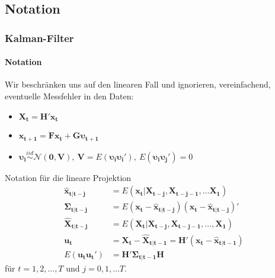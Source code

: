 \documentclass{beamer} %
\begin{document}
\subsection{Notation}
\begin{frame}\frametitle{Kalman-Filter}\framesubtitle{Notation}
Wir beschr\"{a}nken uns auf den linearen Fall und ignorieren, vereinfachend, eventuelle Messfehler in den Daten:
\begin{itemize}
    \item $\mathbf{X_t} = \mathbf{H}'\mathbf{x_t}$
    \item $    \mathbf{x_{t+1}} = \mathbf{F} \mathbf{x_t} + \mathbf{G}\boldsymbol{\upsilon_{t+1}}$
    \item $\boldsymbol{\upsilon_{i}} \overset{iid}{\sim} \mathcal{N}(\mathbf{0},\mathbf{V}),~ \mathbf{V} = E(\boldsymbol{\upsilon_{i}} \boldsymbol{\upsilon_{i}}'), ~ E(\boldsymbol{\upsilon_{i}} \boldsymbol{\upsilon_{j}}')=0$
  \end{itemize}
\scriptsize
\begin{block}{Notation f\"{u}r die lineare Projektion}
\begin{align*}
\mathbf{\widehat{x}_{t|t-j}} &= E(\mathbf{x_t}|\mathbf{X_{t-j}},\mathbf{X_{t-j-1}},\dots \mathbf{X_{1}})\\
\boldsymbol{\Sigma_{t|t-j}} &= E(\mathbf{x_t}-\mathbf{\widehat{x}_{t|t-j}})(\mathbf{x_t}-\mathbf{\widehat{x}_{t|t-j}})'\\
\mathbf{\widehat{X}_{t|t-j}} &= E(\mathbf{X_t|X_{t-j}},\mathbf{X_{t-j-1}},\dots,\mathbf{X_1})\\
\mathbf{u_t} &= \mathbf{X_t} - \mathbf{\widehat{X}_{t|t-1}} = \mathbf{H'} (\mathbf{x_t} - \mathbf{\widehat{x}_{t|t-1}})\\
E(\mathbf{u_t}\mathbf{u_t}')&= \mathbf{H'} \boldsymbol{\Sigma_{t|t-1}} \mathbf{H}
\end{align*}
f\"{u}r $t=1,2,\dots,T$ und $j=0,1,\dots T$.
\end{block}

\end{frame}
\end{document}
